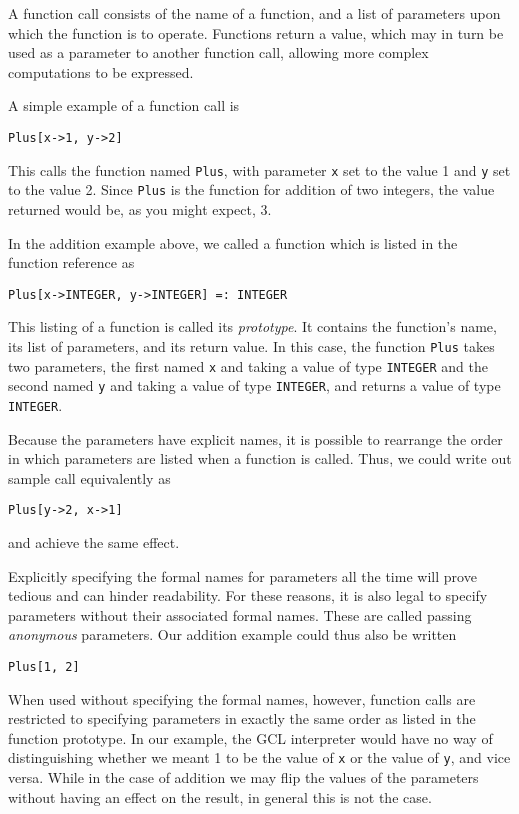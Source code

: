 A function call consists of the name of a function, and a list of
parameters upon which the function is to operate.  Functions return a
value, which may in turn be used as a parameter to another function
call, allowing more complex computations to be expressed.

A simple example of a function call is

\begin{verbatim}
Plus[x->1, y->2]
\end{verbatim}

This calls the function named {\tt Plus}, with parameter \verb+x+ set
to the value 1 and \verb+y+ set to the value 2.  Since {\tt Plus} is
the function for addition of two integers, the value returned would
be, as you might expect, 3.

In the addition example above, we called a function which is listed in
the function reference as

\begin{verbatim}
Plus[x->INTEGER, y->INTEGER] =: INTEGER
\end{verbatim}

\noindent This listing of a function is called its {\it prototype}.  
It contains the function's name, its list of parameters, and its return
value.  In this case, the function {\tt Plus} takes two parameters, the
first named \verb+x+ and taking a value of type {\tt INTEGER} and the
second named \verb+y+ and taking a value of type {\tt INTEGER}, and
returns a value of type {\tt INTEGER}.

Because the parameters have explicit names, it is possible to rearrange
the order in which parameters are listed when a function is called.
Thus, we could write out sample call equivalently as

\begin{verbatim}
Plus[y->2, x->1]
\end{verbatim}

\noindent and achieve the same effect.

Explicitly specifying the formal names for parameters all the time
will prove tedious and can hinder readability.  For these reasons, it is
also legal to specify parameters without their associated formal names.
These are called passing {\it anonymous} parameters.  Our addition
example could thus also be written

\begin{verbatim}
Plus[1, 2]
\end{verbatim}

When used without specifying the formal names, however, function
calls are restricted to specifying parameters in exactly the same
order as listed in the function prototype.  In our example, the GCL
interpreter would have no way of distinguishing whether we meant 1 to
be the value of \verb+x+ or the value of \verb+y+, and vice versa.
While in the case of addition we may flip the values of the parameters
without having an effect on the result, in general this is not the
case.

